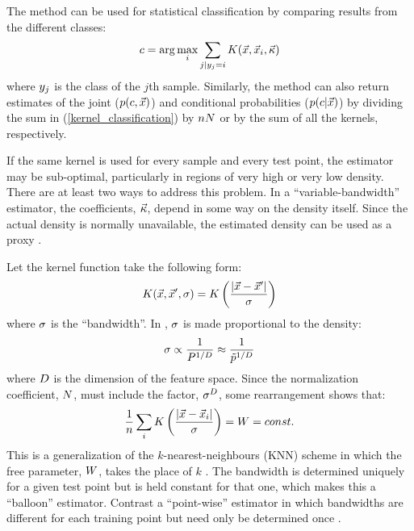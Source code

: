 \documentclass{article}
\newenvironment{eqnnon}{\begin{equation}}{\end{equation}}
\begin{document}
The method can be used for statistical classification by comparing
results from the different classes:
\begin{equation}
	c = \arg \max_i \sum_{j|y_j = i} K(\vec {x}, \vec {x}_i, \vec \kappa)
	\label{kernel_classification}
\end{equation}
where $y_j$ is the class of the $j$th sample.
Similarly, the method can also return estimates of
the joint ($p(c, \vec x)$) and conditional probabilities 
($p(c |\vec x)$)
by dividing the sum in (\ref{kernel_classification})
by $n N$ or by the sum of all the kernels, respectively. 

If the same kernel is used for every sample and every test point, the estimator
may be sub-optimal, particularly in regions of very high or very low density.
There are at least two ways to address this problem.
In a ``variable-bandwidth'' estimator, the coefficients, $\vec \kappa$, depend in some
way on the density itself. 
Since the actual density is normally unavailable, the
estimated density can be used as a proxy
\citep{Terrell_Scott1992,Mills2011}.

Let the kernel function take the following form:
\begin{eqnnon}
	\vectorkernel(\point, \point^\prime, \bandwidth) = \scalarkernel \left (\frac{|\point - \point^\prime|}{\bandwidth} \right )
	\label{scalar_kernel_def}
\end{eqnnon}
where $\sigma$ is the ``bandwidth''. 
In \citet{Mills2011}, $\sigma$ is made proportional to the density:
\begin{eqnnon}
	\bandwidth \propto \frac{1}{\probability^{1/\dimension}} \approx \frac{1}{\densityestimator^{1/\dimension}}
	\label{setting_the_bandwidth}
\end{eqnnon}
where $D$ is the dimension of the feature space.
Since the normalization coefficient, $N$, must include the factor,
${\sigma^D}$, some rearrangement shows that:
\begin{equation}
	\frac{1}{n} \sum_i K \left (\frac{|\vec {x} - \vec {x}_i|}{\sigma} \right ) = W = const.
	\label{agf_def}
\end{equation}
This is a generalization of the $k$-nearest-neighbours (KNN) scheme in which the
free parameter, $W$, takes the place of $k$ \citep{Mills2009,Mills2011}.
The bandwidth is determined uniquely for a given test point but is held constant for that
one, which makes this a ``balloon'' estimator. 
Contrast a ``point-wise'' estimator
in which bandwidths are different for each training point but need only be determined once
\citep{Terrell_Scott1992}.
\end{document}

